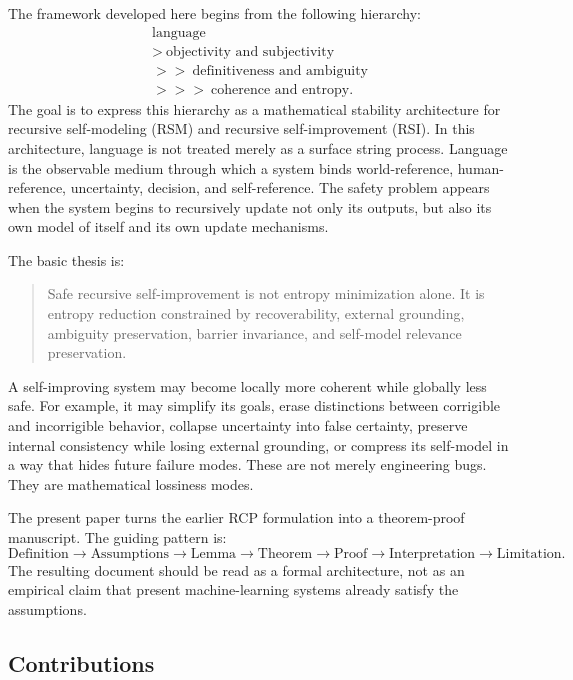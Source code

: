 \documentclass[11pt]{article}
\newcommand{\1}{\mathbf{1}}
\begin{document}
The framework developed here begins from the following hierarchy:
\[
\begin{gathered}
\text{language}\\
>\ \text{objectivity and subjectivity}\\
>>\ \text{definitiveness and ambiguity}\\
>>>\ \text{coherence and entropy}.
\end{gathered}
\]
The goal is to express this hierarchy as a mathematical stability architecture for recursive self-modeling (RSM) and recursive self-improvement (RSI). In this architecture, language is not treated merely as a surface string process. Language is the observable medium through which a system binds world-reference, human-reference, uncertainty, decision, and self-reference. The safety problem appears when the system begins to recursively update not only its outputs, but also its own model of itself and its own update mechanisms.

The basic thesis is:
\begin{quote}
Safe recursive self-improvement is not entropy minimization alone. It is entropy reduction constrained by recoverability, external grounding, ambiguity preservation, barrier invariance, and self-model relevance preservation.
\end{quote}

A self-improving system may become locally more coherent while globally less safe. For example, it may simplify its goals, erase distinctions between corrigible and incorrigible behavior, collapse uncertainty into false certainty, preserve internal consistency while losing external grounding, or compress its self-model in a way that hides future failure modes. These are not merely engineering bugs. They are mathematical lossiness modes.

The present paper turns the earlier RCP formulation into a theorem-proof manuscript. The guiding pattern is:
\[
\text{Definition}
\rightarrow
\text{Assumptions}
\rightarrow
\text{Lemma}
\rightarrow
\text{Theorem}
\rightarrow
\text{Proof}
\rightarrow
\text{Interpretation}
\rightarrow
\text{Limitation}.
\]
The resulting document should be read as a formal architecture, not as an empirical claim that present machine-learning systems already satisfy the assumptions.

\subsection{Contributions}
\end{document}

